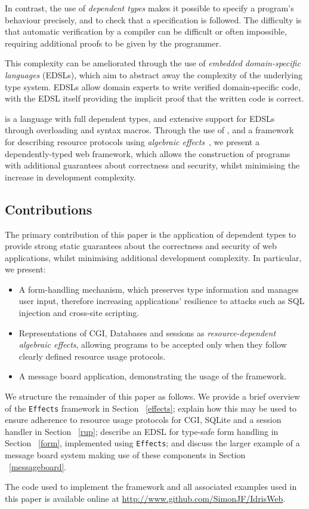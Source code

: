 In contrast, the use of \textit{dependent types} makes it possible
to specify a program's behaviour precisely, and to check that a 
specification is followed.
%
The difficulty is 
that automatic verification by a compiler can be difficult or
often impossible, requiring additional proofs to be given by the programmer.

This complexity can be ameliorated through the use of \textit{embedded
domain-specific languages} (EDSLs), which aim to abstract away the
complexity of the underlying type system. EDSLs allow domain experts to
write verified domain-specific code, with the EDSL itself providing the implicit proof that the written code is correct.

\idris{} \cite{brady2013idris} is a language with full dependent types, and
extensive support for EDSLs through overloading and syntax macros. Through the
use of \idris{}, and a framework for describing resource protocols using
\emph{algebraic effects}~\cite{brady:effects}, we
present a dependently-typed web framework, which allows the construction of
programs with additional guarantees about correctness and security, whilst
minimising the increase in development complexity. 

\subsection{Contributions}
The primary contribution of this paper is the application of 
dependent types to provide strong static guarantees
about the correctness and security of web applications, whilst minimising
additional development complexity. In particular, we present:

\begin{itemize}
\item A form-handling mechanism, which preserves type information and
manages user input, therefore
increasing applications' resilience to attacks such as SQL injection and cross-site scripting.

\item Representations of CGI, Databases and sessions as
\textit{resource-dependent algebraic effects}, allowing programs to be accepted only when they
follow clearly defined resource usage protocols.

\item A message board application, demonstrating the usage of the framework.

\end{itemize}

We structure the remainder of this paper as follows. We provide a brief
overview of the \texttt{Effects} framework in Section ~\ref{effects}; explain
how this may be used to ensure adherence to resource usage protocols for CGI,
SQLite and a session handler in Section ~\ref{rup}; describe an EDSL for
type-safe form handling in Section ~\ref{form}, implemented using
\texttt{Effects}; and discuss the larger example
of a message board system making use of these components in Section
~\ref{messageboard}.

The code used to implement the framework and all associated examples used in this paper is available online at \url{http://www.github.com/SimonJF/IdrisWeb}.

